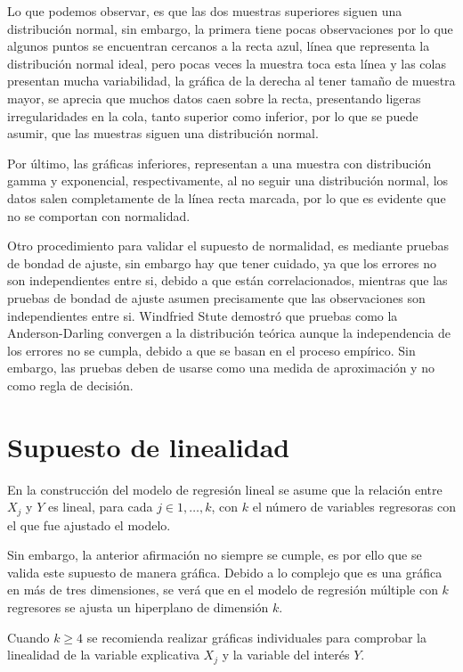 \documentclass[
  a4paper,
  oneside,
  openany]{book}
\begin{document}
Lo que podemos observar, es que las dos muestras superiores siguen una distribución normal, sin embargo, la primera tiene pocas observaciones por lo que algunos puntos se encuentran cercanos a la recta azul, línea que representa la distribución normal ideal, pero pocas veces la muestra toca esta línea y las colas presentan mucha variabilidad, la gráfica de la derecha al tener tamaño de muestra mayor, se aprecia que muchos datos caen sobre la recta, presentando ligeras irregularidades en la cola, tanto superior como inferior, por lo que se puede asumir, que las muestras siguen una distribución normal.

Por último, las gráficas inferiores, representan a una muestra con distribución gamma y exponencial, respectivamente, al no seguir una distribución normal, los datos salen completamente de la línea recta marcada, por lo que es evidente que no se comportan con normalidad.

Otro procedimiento para validar el supuesto de normalidad, es mediante pruebas de bondad de ajuste, sin embargo hay que tener cuidado, ya que los errores no son independientes entre si, debido a que están correlacionados, mientras que las pruebas de bondad de ajuste asumen precisamente que las observaciones son independientes entre si. Windfried Stute demostró que pruebas como la Anderson-Darling convergen a la distribución teórica aunque la independencia de los errores no se cumpla, debido a que se basan en el proceso empírico. Sin embargo, las pruebas deben de usarse como una medida de aproximación y no como regla de decisión.

\hypertarget{supuesto-de-linealidad}{%
\section{Supuesto de linealidad}\label{supuesto-de-linealidad}}

En la construcción del modelo de regresión lineal se asume que la relación entre \(X_{j}\) y \(Y\) es lineal, para cada \(j \in 1,\ldots,k\), con \(k\) el número de variables regresoras con el que fue ajustado el modelo.

Sin embargo, la anterior afirmación no siempre se cumple, es por ello que se valida este supuesto de manera gráfica. Debido a lo complejo que es una gráfica en más de tres dimensiones, se verá que en el modelo de regresión múltiple con \(k\) regresores se ajusta un hiperplano de dimensión \(k\).

Cuando \(k\geq 4\) se recomienda realizar gráficas individuales para comprobar la linealidad de la variable explicativa \(X_{j}\) y la variable del interés \(Y\).
\end{document}
